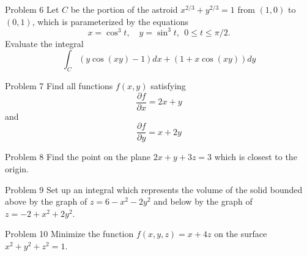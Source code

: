 \documentclass{beamer}
\begin{document}
\begin{frame}{Problem 6}
Let $C$ be the portion of the astroid $x^{2/3}+y^{2/3}=1$ from $(1,0)$ to $(0,1)$, which is parameterized by the equations
$$x=\cos^3 t,\quad y=\sin^3 t,\ \ 0\leq t\leq \pi/2.$$
Evaluate the integral
$$\int_C(y\cos(xy)-1)dx + (1+x\cos(xy))dy$$
\end{frame}

\begin{frame}{Problem 7}
Find all functions $f(x,y)$ satisfying 
$$\frac{\partial f}{\partial x} = 2x + y$$ and $$\frac{\partial f}{\partial y} = x + 2y$$
\end{frame}



\begin{frame}{Problem 8}
Find the point on the plane $2x + y + 3z = 3$ which is closest to the origin.
\end{frame}

\begin{frame}{Problem 9}
Set up an integral which represents the volume of the solid bounded above
by the graph of $z = 6 - x^2 - 2y^2$ and below by the graph of $z = -2 + x^2 + 2y^2$.
\end{frame}

\begin{frame}{Problem 10}
Minimize the function $f(x, y, z) = x + 4z$ on the surface $x^2+y^2+z^2=1$.
\end{frame}
\end{document}
